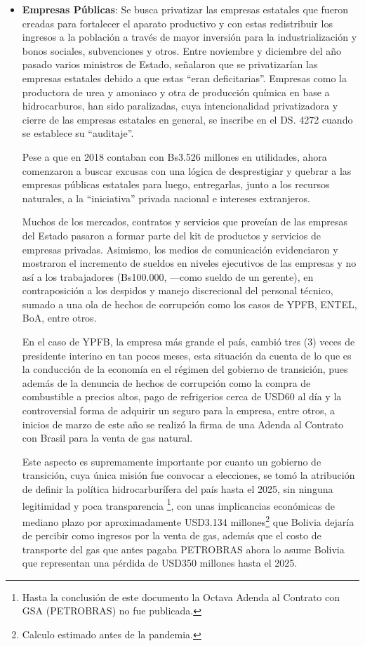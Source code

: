 \documentclass[a4paper, nobind]{templates/ociamthesis}
\begin{document}
\begin{itemize}
\item
  \textbf{Empresas Públicas}: Se busca privatizar las empresas estatales que fueron creadas para fortalecer el aparato productivo y con estas redistribuir los ingresos a la población a través de mayor inversión para la industrialización y bonos sociales, subvenciones y otros. Entre noviembre y diciembre del año pasado varios ministros de Estado, señalaron que se privatizarían las empresas estatales debido a que estas ``eran deficitarias''. Empresas como la productora de urea y amoniaco y otra de producción química en base a hidrocarburos, han sido paralizadas, cuya intencionalidad privatizadora y cierre de las empresas estatales en general, se inscribe en el DS. 4272 cuando se establece su ``auditaje''.

  Pese a que en 2018 contaban con Bs3.526 millones en utilidades, ahora comenzaron a buscar excusas con una lógica de desprestigiar y quebrar a las empresas públicas estatales para luego, entregarlas, junto a los recursos naturales, a la ``iniciativa'' privada nacional e intereses extranjeros.

  Muchos de los mercados, contratos y servicios que proveían de las empresas del Estado pasaron a formar parte del kit de productos y servicios de empresas privadas. Asimismo, los medios de comunicación evidenciaron y mostraron el incremento de sueldos en niveles ejecutivos de las empresas y no así a los trabajadores (Bs100.000, ---como sueldo de un gerente), en contraposición a los despidos y manejo discrecional del personal técnico, sumado a una ola de hechos de corrupción como los casos de YPFB, ENTEL, BoA, entre otros.

  En el caso de YPFB, la empresa más grande el país, cambió tres (3) veces de presidente interino en tan pocos meses, esta situación da cuenta de lo que es la conducción de la economía en el régimen del gobierno de transición, pues además de la denuncia de hechos de corrupción como la compra de combustible a precios altos, pago de refrigerios cerca de USD60 al día y la controversial forma de adquirir un seguro para la empresa, entre otros, a inicios de marzo de este año se realizó la firma de una Adenda al Contrato con Brasil para la venta de gas natural.

  Este aspecto es supremamente importante por cuanto un gobierno de transición, cuya única misión fue convocar a elecciones, se tomó la atribución de definir la política hidrocarburífera del país hasta el 2025, sin ninguna legitimidad y poca transparencia \footnote{Hasta la conclusión de este documento la Octava Adenda al Contrato con GSA (PETROBRAS) no fue publicada.}, con unas implicancias económicas de mediano plazo por aproximadamente USD3.134 millones\footnote{Calculo estimado antes de la pandemia.} que Bolivia dejaría de percibir como ingresos por la venta de gas, además que el costo de transporte del gas que antes pagaba PETROBRAS ahora lo asume Bolivia que representan una pérdida de USD350 millones hasta el 2025.


\end{itemize}
\end{document}
